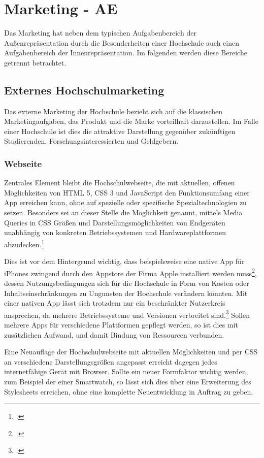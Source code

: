 \section{Marketing - AE}
\label{section_marketing}
Das Marketing hat neben dem typischen Aufgabenbereich der Außenrepräsentation durch die Besonderheiten einer Hochschule auch einen Aufgabenbereich der Innenrepräsentation. Im folgenden werden diese Bereiche getrennt betrachtet.

\subsection{Externes Hochschulmarketing}
\label{subsection_externes_hochschulemarketing}
Das externe Marketing der Hochschule bezieht sich auf die klassischen Marketingaufgaben, das Produkt und die Marke vorteilhaft darzustellen. Im Falle einer Hochschule ist dies die attraktive Darstellung gegenüber zukünftigen Studierenden, Forschungsinteressierten und Geldgebern.

\subsubsection{Webseite}
Zentrales Element bleibt die Hochschulwebseite, die mit aktuellen, offenen Möglichkeiten von HTML 5, CSS 3 und JavaScript den Funktionsumfang einer App erreichen kann, ohne auf spezielle oder spezifische Spezialtechnologien zu setzen. Besonders sei an dieser Stelle die Möglichkeit genannt, mittels Media Queries in CSS Größen und Darstellungsmöglichkeiten von Endgeräten unabhängig von konkreten Betriebssystemen und Hardwareplattformen abzudecken.\footcite[Vgl.][]{w3c_media_queries_url}

Dies ist vor dem Hintergrund wichtig, dass beispielsweise eine native App für iPhones zwingend durch den Appstore der Firma Apple installiert werden muss\footcite[Vgl.][]{apple_app_distribution_guide_url}, dessen Nutzungsbedingungen sich für die Hochschule in Form von Kosten oder Inhaltseinschränkungen zu Ungunsten der Hochschule verändern könnten. Mit einer nativen App lässt sich trotzdem nur ein beschränkter Nutzerkreis ansprechen, da mehrere Betriebssysteme und Versionen verbreitet sind.\footcite[Vgl.][]{kantarworldpanel_mobile_betriebssysteme_url} Sollen mehrere Apps für verschiedene Plattformen gepflegt werden, so ist dies mit zusätzlichen Aufwand, und damit Bindung von Ressourcen verbunden.

Eine Neuauflage der Hochschulwebseite mit aktuellen Möglichkeiten und per CSS an verschiedene Darstellungsgrößen angepasst erreicht dagegen jedes internetfähige Gerät mit Browser. Sollte ein neuer Formfaktor wichtig werden, zum Beispiel der einer Smartwatch, so lässt sich dies über eine Erweiterung des Stylesheets erreichen, ohne eine komplette Neuentwicklung in Auftrag zu geben.

